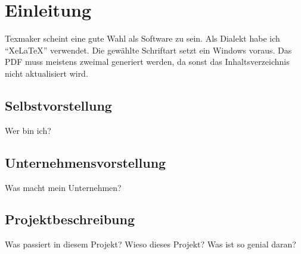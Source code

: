 \chapter{Einleitung}
Texmaker scheint eine gute Wahl als Software zu sein. Als Dialekt habe ich \enquote{XeLaTeX} verwendet. Die gewählte Schriftart setzt ein Windows voraus. Das PDF muss meistens zweimal generiert werden, da sonst das Inhaltsverzeichnis nicht aktualisiert wird.

\section{Selbstvorstellung}
Wer bin ich?

\section{Unternehmensvorstellung}
Was macht mein Unternehmen?

\section{Projektbeschreibung}
Was passiert in diesem Projekt? Wieso dieses Projekt? Was ist so genial daran?
